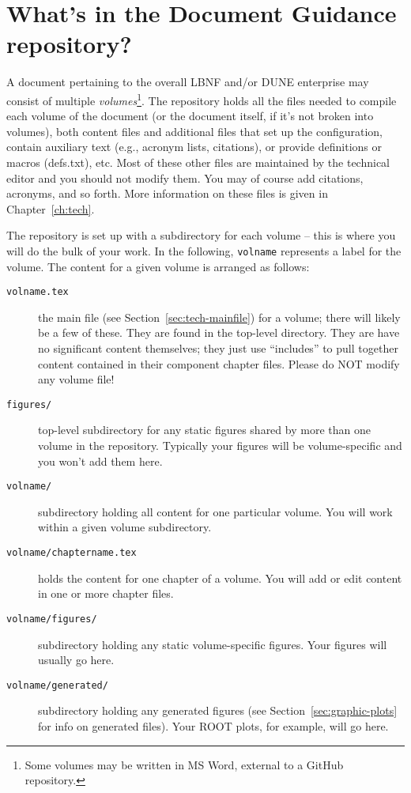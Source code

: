 \section{What's in the Document Guidance repository?}
\label{sec:gen-repo}


A document pertaining to the overall LBNF and/or DUNE enterprise may consist of multiple \textit{volumes}\footnote{Some volumes may be written in MS Word, external to a GitHub repository.}.  The repository holds all the files needed to compile each volume of the document (or the document itself, if it's not broken into volumes), both content files and additional files that set up the configuration, 
contain auxiliary text (e.g., acronym lists, citations), or provide definitions or macros (defs.txt), etc.  Most of these other files are maintained by the technical editor and you should not modify them. You may of course add citations, acronyms, and so forth.  More information on these files is given in Chapter~\ref{ch:tech}.


The repository is set up with a subdirectory for each volume -- this is where you will do the bulk of your work. In the following, \texttt{volname} represents a label for the volume. The content for a given volume is
arranged as follows:

\begin{description}
\item[\texttt{volname.tex}] the main file (see Section~\ref{sec:tech-mainfile}) for a volume; there will likely be a few of these. They are found in the top-level
  directory. They are have no significant content themselves; they just use
  ``includes'' to pull together content contained in their component chapter files. Please do NOT modify any volume file!
\item[\texttt{figures/}] top-level subdirectory for any static figures
  shared by more than one volume in the repository. Typically your figures will be volume-specific and you won't add them here.
\item[\texttt{volname/}] subdirectory holding all content for one particular volume. You will work within a given volume subdirectory.
\item[\texttt{volname/chaptername.tex}] holds the content for one chapter of a volume. You will add or edit content in one or more chapter files.
\item[\texttt{volname/figures/}] subdirectory holding any static volume-specific figures. Your figures will usually go here.
\item[\texttt{volname/generated/}] subdirectory holding any generated
  figures (see Section~\ref{sec:graphic-plots} for info on generated files). Your ROOT plots, for example, will go here.
\end{description}


